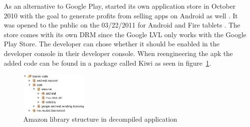 As an alternative to Google Play, started its own application store in October 2010 with the goal to generate profits from selling apps on Android as well \cite{amazonBeta}.
It was opened to the public on the 03/22/2011 for Android and Fire tablets \cite{amazonRelease}.
The store comes with its own DRM since the Google LVL only works with the Google Play Store.
The developer can chose whether it should be enabled in the developer console  in their developer console.
When reengineering the \gls{apk} the added code can be found in a package called Kiwi as seen in figure~\ref{fig:amazonFolder}. \cite{amazonDeveloper}
\begin{figure}[h]
    \centering
    \includegraphics[width=0.3\textwidth]{data/amazonFolder.png}
    \caption{Amazon library structure in decompiled application}
    \label{fig:amazonFolder}
\end{figure}
